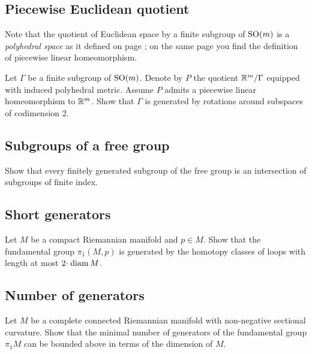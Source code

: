 \subsection*{Piecewise Euclidean quotient}\label{Piecewise Euclidean quotient}

Note that the quotient of Euclidean space by a finite subgroup of $\mathrm{SO}(m)$ is a {}\emph{polyhedral space} as it defined on page \pageref{piecewise linear map};
on the same page you find the definition of piecewise linear homeomorphism.


\begin{pr}
Let $\Gamma$ be a finite subgroup of $\mathrm{SO}(m)$.
Denote by $P$ the quotient $\mathbb{R}^m/\Gamma$ equipped with induced
polyhedral metric.
Assume $P$ admits a piecewise linear homeomorphism to $\mathbb{R}^m$.
Show that $\Gamma$ is generated by rotations  around subspaces of codimension $2$.
\end{pr}

\subsection*{Subgroups of a free group}\label{Subgroups of free group} 

\begin{pr}
Show that every finitely generated subgroup of the free group 
is an intersection of subgroups of finite index.
\end{pr}

\subsection*{Short generators\easy}\label{Lengths of generators of the fundamental group}

\begin{pr}
Let $M$ be a compact Riemannian manifold and $p\in M$.
Show that the fundamental group $\pi_1(M,p)$
is generated by the homotopy classes of loops with length at most $2\cdot\diam M$.
\end{pr}

\subsection*{Number of generators}\label{Number of generators}

\begin{pr}
Let $M$ be a complete connected Riemannian manifold with non-negative sectional curvature.
Show that the minimal number of generators of the fundamental group $\pi_1 M$
can be bounded above in terms of the dimension of $M$.
\end{pr}

